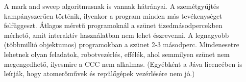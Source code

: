 A mark and sweep algoritmusnak is vannak hátrányai.
A szemétgyűjtés kampányszerűen történik, ilyenkor a program minden 
más tevékenységet felfüggeszt. Átlagos méretű programoknál a szünet 
tizedmásodpercekben mérhető, amit interaktív használatban nem lehet észrevenni.
A legnagyobb (többmillió objektumos) programokban a szünet 2-3 másodperc.
Mindenesetre lehetnek olyan feladatok, robotvezérlés, effélék, ahol semmilyen
szünet nem megengedhető, ilyesmire a CCC nem alkalmas. (Egyébként a Jáva
licencében is leírják, hogy atomerőművek és repülőgépek vezérlésére nem jó.)






